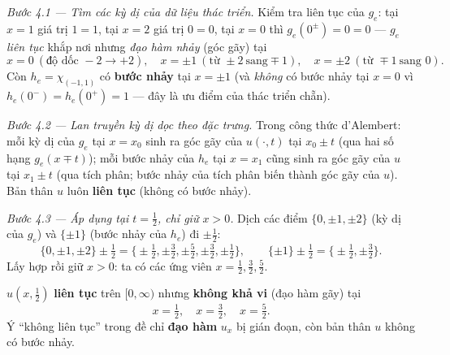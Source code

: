 \emph{Bước 4.1 --- Tìm các kỳ dị của dữ liệu thác triển.} Kiểm tra liên tục của $g_e$: tại $x=1$ giá trị $1=1$, tại $x=2$ giá trị $0=0$, tại $x=0$ thì $g_e(0^\pm)=0=0$ --- $g_e$ \emph{liên tục} khắp nơi nhưng \emph{đạo hàm nhảy} (góc gãy) tại
\[
  x=0\ (\text{độ dốc } -2\to +2),\quad
  x=\pm1\ (\text{từ } \pm2\ \text{sang} \mp1),\quad
  x=\pm2\ (\text{từ } \mp1\ \text{sang } 0).
\]
Còn $h_e=\chi_{(-1,1)}$ có \textbf{bước nhảy} tại $x=\pm1$ (và \emph{không} có bước nhảy tại $x=0$ vì $h_e(0^-)=h_e(0^+)=1$ --- đây là ưu điểm của thác triển chẵn).

\emph{Bước 4.2 --- Lan truyền kỳ dị dọc theo đặc trưng.} Trong công thức d'Alembert: mỗi kỳ dị của $g_e$ tại $x=x_0$ sinh ra góc gãy của $u(\cdot,t)$ tại $x_0\pm t$ (qua hai số hạng $g_e(x\mp t)$); mỗi bước nhảy của $h_e$ tại $x=x_1$ cũng sinh ra góc gãy của $u$ tại $x_1\pm t$ (qua tích phân; bước nhảy của tích phân biến thành góc gãy của $u$). Bản thân $u$ luôn \textbf{liên tục} (không có bước nhảy).

\emph{Bước 4.3 --- Áp dụng tại $t=\tfrac12$, chỉ giữ $x>0$.} Dịch các điểm $\{0,\pm1,\pm2\}$ (kỳ dị của $g_e$) và $\{\pm1\}$ (bước nhảy của $h_e$) đi $\pm\tfrac12$:
\[
  \{0,\pm1,\pm2\}\pm\tfrac12=\Big\{\pm\tfrac12,\pm\tfrac32,\pm\tfrac52,\pm\tfrac32,\pm\tfrac12\Big\},\qquad
  \{\pm1\}\pm\tfrac12=\Big\{\pm\tfrac12,\pm\tfrac32\Big\}.
\]
Lấy hợp rồi giữ $x>0$: ta có các ứng viên $x=\tfrac12,\tfrac32,\tfrac52$.

\begin{nhobox}
$u(x,\tfrac12)$ \textbf{liên tục} trên $[0,\infty)$ nhưng \textbf{không khả vi} (đạo hàm gãy) tại
\[
  x=\tfrac12,\quad x=\tfrac32,\quad x=\tfrac52.
\]
Ý ``không liên tục'' trong đề chỉ \textbf{đạo hàm} $u_x$ bị gián đoạn, còn bản thân $u$ không có bước nhảy.
\end{nhobox}
